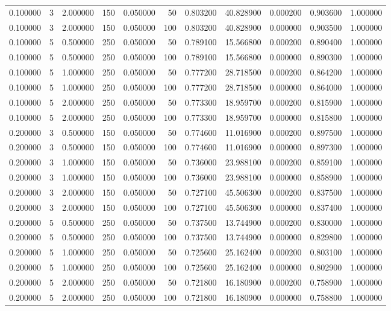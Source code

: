 \begin{table}
\begin{tabular}{rrrrrrrrrrr}
0.100000 & 3 & 2.000000 & 150 & 0.050000 & 50 & 0.803200 & 40.828900 & 0.000200 & 0.903600 & 1.000000 \\
0.100000 & 3 & 2.000000 & 150 & 0.050000 & 100 & 0.803200 & 40.828900 & 0.000000 & 0.903500 & 1.000000 \\
0.100000 & 5 & 0.500000 & 250 & 0.050000 & 50 & 0.789100 & 15.566800 & 0.000200 & 0.890400 & 1.000000 \\
0.100000 & 5 & 0.500000 & 250 & 0.050000 & 100 & 0.789100 & 15.566800 & 0.000000 & 0.890300 & 1.000000 \\
0.100000 & 5 & 1.000000 & 250 & 0.050000 & 50 & 0.777200 & 28.718500 & 0.000200 & 0.864200 & 1.000000 \\
0.100000 & 5 & 1.000000 & 250 & 0.050000 & 100 & 0.777200 & 28.718500 & 0.000000 & 0.864000 & 1.000000 \\
0.100000 & 5 & 2.000000 & 250 & 0.050000 & 50 & 0.773300 & 18.959700 & 0.000200 & 0.815900 & 1.000000 \\
0.100000 & 5 & 2.000000 & 250 & 0.050000 & 100 & 0.773300 & 18.959700 & 0.000000 & 0.815800 & 1.000000 \\
0.200000 & 3 & 0.500000 & 150 & 0.050000 & 50 & 0.774600 & 11.016900 & 0.000200 & 0.897500 & 1.000000 \\
0.200000 & 3 & 0.500000 & 150 & 0.050000 & 100 & 0.774600 & 11.016900 & 0.000000 & 0.897300 & 1.000000 \\
0.200000 & 3 & 1.000000 & 150 & 0.050000 & 50 & 0.736000 & 23.988100 & 0.000200 & 0.859100 & 1.000000 \\
0.200000 & 3 & 1.000000 & 150 & 0.050000 & 100 & 0.736000 & 23.988100 & 0.000000 & 0.858900 & 1.000000 \\
0.200000 & 3 & 2.000000 & 150 & 0.050000 & 50 & 0.727100 & 45.506300 & 0.000200 & 0.837500 & 1.000000 \\
0.200000 & 3 & 2.000000 & 150 & 0.050000 & 100 & 0.727100 & 45.506300 & 0.000000 & 0.837400 & 1.000000 \\
0.200000 & 5 & 0.500000 & 250 & 0.050000 & 50 & 0.737500 & 13.744900 & 0.000200 & 0.830000 & 1.000000 \\
0.200000 & 5 & 0.500000 & 250 & 0.050000 & 100 & 0.737500 & 13.744900 & 0.000000 & 0.829800 & 1.000000 \\
0.200000 & 5 & 1.000000 & 250 & 0.050000 & 50 & 0.725600 & 25.162400 & 0.000200 & 0.803100 & 1.000000 \\
0.200000 & 5 & 1.000000 & 250 & 0.050000 & 100 & 0.725600 & 25.162400 & 0.000000 & 0.802900 & 1.000000 \\
0.200000 & 5 & 2.000000 & 250 & 0.050000 & 50 & 0.721800 & 16.180900 & 0.000200 & 0.758900 & 1.000000 \\
0.200000 & 5 & 2.000000 & 250 & 0.050000 & 100 & 0.721800 & 16.180900 & 0.000000 & 0.758800 & 1.000000 \\
\bottomrule
\end{tabular}
\end{table}
